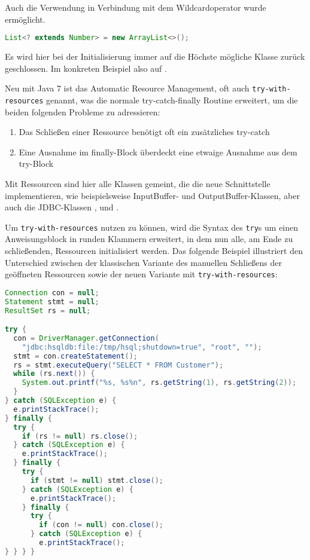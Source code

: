 \documentclass[times, 10pt,twocolumn]{article}
\begin{document}
Auch die Verwendung in Verbindung mit dem Wildcardoperator wurde ermöglicht.
\begin{lstlisting}[language=java,breaklines=true]
  List<? extends Number> = new ArrayList<>();
\end{lstlisting}
Es wird hier bei der Initialisierung immer auf die Höchste mögliche Klasse zurück geschlossen. Im konkreten Beispiel also auf .\cite{v2bJava7}

Neu mit Java 7 ist das Automatic Resource Management, oft auch \texttt{try-with-resources} genannt, was die normale try-catch-finally 
Routine erweitert, um die beiden folgenden Probleme zu adressieren:\cite{javainsel2}
\begin{enumerate}
\item Das Schließen einer Ressource benötigt oft ein zusätzliches try-catch
\item Eine Ausnahme im finally-Block überdeckt eine etwaige Ausnahme aus dem try-Block
\end{enumerate}

Mit Ressourcen sind hier alle Klassen gemeint, die die neue Schnittstelle  implementieren, wie beispielsweise
InputBuffer- und OutputBuffer-Klassen, aber auch die JDBC-Klassen ,  und .

Um \texttt{try-with-resources} nutzen zu können, wird die Syntax des \texttt{try}s um einen Anweisungsblock in runden Klammern erweitert,
in dem nun alle, am Ende zu schließenden, Ressourcen initialisiert werden. Das folgende Beispiel illustriert den Unterschied zwischen der
klassischen Variante des manuellen Schließens der geöffneten Ressourcen sowie der neuen Variante mit \texttt{try-with-resources}:

\begin{lstlisting}[language=java,breaklines=true]
Connection con = null;
Statement stmt = null;
ResultSet rs = null;

try {
  con = DriverManager.getConnection(
	"jdbc:hsqldb:file:/tmp/hsql;shutdown=true", "root", "");
  stmt = con.createStatement();
  rs = stmt.executeQuery("SELECT * FROM Customer");
  while (rs.next()) {
	System.out.printf("%s, %s%n", rs.getString(1), rs.getString(2));
  }
} catch (SQLException e) {
  e.printStackTrace();
} finally {
  try {
	if (rs != null) rs.close();
  } catch (SQLException e) {
	e.printStackTrace();
  } finally {
	try {
	  if (stmt != null)	stmt.close();
	} catch (SQLException e) {
	  e.printStackTrace();
	} finally {
	  try {
		if (con != null) con.close();
	  } catch (SQLException e) {
		e.printStackTrace();
} } } }
\end{lstlisting}
\end{document}

